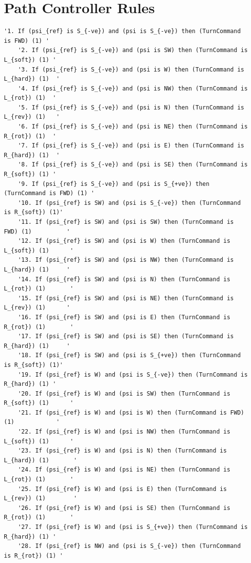 \documentclass[10pt]{article}
\begin{document}
\section{Path Controller Rules}
\begin{verbatim}
'1. If (psi_{ref} is S_{-ve}) and (psi is S_{-ve}) then (TurnCommand is FWD) (1) '
    '2. If (psi_{ref} is S_{-ve}) and (psi is SW) then (TurnCommand is L_{soft}) (1) '
    '3. If (psi_{ref} is S_{-ve}) and (psi is W) then (TurnCommand is L_{hard}) (1)  '
    '4. If (psi_{ref} is S_{-ve}) and (psi is NW) then (TurnCommand is L_{rot}) (1)  '
    '5. If (psi_{ref} is S_{-ve}) and (psi is N) then (TurnCommand is L_{rev}) (1)   '
    '6. If (psi_{ref} is S_{-ve}) and (psi is NE) then (TurnCommand is R_{rot}) (1)  '
    '7. If (psi_{ref} is S_{-ve}) and (psi is E) then (TurnCommand is R_{hard}) (1)  '
    '8. If (psi_{ref} is S_{-ve}) and (psi is SE) then (TurnCommand is R_{soft}) (1) '
    '9. If (psi_{ref} is S_{-ve}) and (psi is S_{+ve}) then (TurnCommand is FWD) (1) '
    '10. If (psi_{ref} is SW) and (psi is S_{-ve}) then (TurnCommand is R_{soft}) (1)'
    '11. If (psi_{ref} is SW) and (psi is SW) then (TurnCommand is FWD) (1)          '
    '12. If (psi_{ref} is SW) and (psi is W) then (TurnCommand is L_{soft}) (1)      '
    '13. If (psi_{ref} is SW) and (psi is NW) then (TurnCommand is L_{hard}) (1)     '
    '14. If (psi_{ref} is SW) and (psi is N) then (TurnCommand is L_{rot}) (1)       '
    '15. If (psi_{ref} is SW) and (psi is NE) then (TurnCommand is L_{rev}) (1)      '
    '16. If (psi_{ref} is SW) and (psi is E) then (TurnCommand is R_{rot}) (1)       '
    '17. If (psi_{ref} is SW) and (psi is SE) then (TurnCommand is R_{hard}) (1)     '
    '18. If (psi_{ref} is SW) and (psi is S_{+ve}) then (TurnCommand is R_{soft}) (1)'
    '19. If (psi_{ref} is W) and (psi is S_{-ve}) then (TurnCommand is R_{hard}) (1) '
    '20. If (psi_{ref} is W) and (psi is SW) then (TurnCommand is R_{soft}) (1)      '
    '21. If (psi_{ref} is W) and (psi is W) then (TurnCommand is FWD) (1)            '
    '22. If (psi_{ref} is W) and (psi is NW) then (TurnCommand is L_{soft}) (1)      '
    '23. If (psi_{ref} is W) and (psi is N) then (TurnCommand is L_{hard}) (1)       '
    '24. If (psi_{ref} is W) and (psi is NE) then (TurnCommand is L_{rot}) (1)       '
    '25. If (psi_{ref} is W) and (psi is E) then (TurnCommand is L_{rev}) (1)        '
    '26. If (psi_{ref} is W) and (psi is SE) then (TurnCommand is R_{rot}) (1)       '
    '27. If (psi_{ref} is W) and (psi is S_{+ve}) then (TurnCommand is R_{hard}) (1) '
    '28. If (psi_{ref} is NW) and (psi is S_{-ve}) then (TurnCommand is R_{rot}) (1) '

\end{verbatim}
\end{document}
